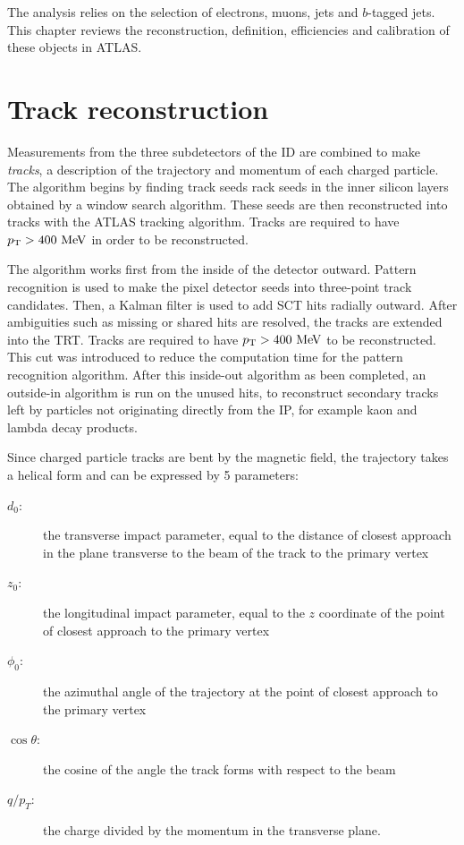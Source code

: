 
The analysis relies on the selection of electrons, muons, jets and $b$-tagged jets. This chapter reviews the reconstruction, definition, efficiencies and calibration of these objects in ATLAS.
\section{Track reconstruction}
Measurements from the three subdetectors of the ID are combined to make \emph{tracks}, a description of the trajectory and momentum of each charged particle. The algorithm begins by finding track seeds rack seeds in the inner silicon layers obtained by a window search algorithm. These seeds are then reconstructed into tracks with the ATLAS tracking algorithm\cite{ATLAS-CONF-2012-042}. Tracks are required to have $\pt > 400 \mev$ in order to be reconstructed.

The algorithm works first from the inside of the detector outward. Pattern recognition is used to make the pixel detector seeds into three-point track candidates. Then, a Kalman filter is used to add SCT hits radially outward. After ambiguities such as missing or shared hits are resolved, the tracks are extended into the TRT. Tracks are required to have $\pt > 400 \mev$ to be reconstructed. This cut was introduced to reduce the computation time for the pattern recognition algorithm. After this inside-out algorithm as been completed, an outside-in algorithm is run on the unused hits, to reconstruct secondary tracks left by particles not originating directly from the IP, for example kaon and lambda decay products.

Since charged particle tracks are bent by the magnetic field, the trajectory takes a helical form and can be expressed by 5 parameters: 
\begin{description}
\item[$d_0$:] the transverse impact parameter, equal to the distance of closest approach in the plane transverse to the beam of the track to the primary vertex
\item[$z_0$:] the longitudinal impact parameter, equal to the $z$ coordinate of the point of closest approach to the primary vertex
\item[$\phi_0$:] the azimuthal angle of the trajectory at the point of closest approach to the primary vertex
\item[$\cos\theta$:] the cosine of the angle the track forms with respect to the beam
\item[$q/p_T$:] the charge divided by the momentum in the transverse plane.
\end{description}



